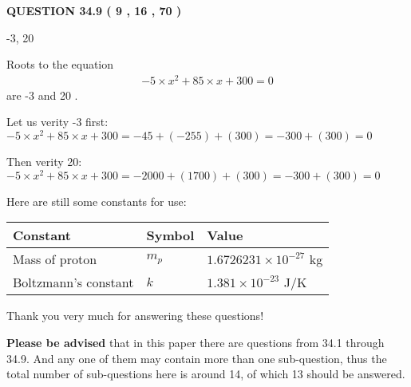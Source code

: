 \documentclass[12pt]{article}
\begin{document}
 
 
  
\vspace{0.2in}
  
{\textbf{\Large{QUESTION
34.9 
 (           9 ,          16 ,          70 )
}}}
  
  


 
 
\noindent{}

-3,  %
20
 
 
 
 
 
\noindent{}

Roots to the equation
\begin{eqnarray*}
-5 \times x^2  %
+  %
85
                 \times x    %
+  %
300 =0
\end{eqnarray*}
are  %
-3 and  %
20 .
 
Let us verity  %
-3 first:
$  %
-5 \times x^2  %
+  %
85
                 \times x    %
+  %
300
  = %
-45+( %
-255)+( %
300)
  = %
-300+( %
300)
  = %
0
$
 
Then verity  %
20:
$  %
-5 \times x^2  %
+  %
85
                 \times x    %
+  %
300
  = %
-2000+( %
1700)+( %
300)
  = %
-300+( %
300)
  = %
0
$
 
 
 
   
   
 \vspace{0.2in}
Here are still some constants for use:
 
 
\noindent\begin{tabular}{|l|l|l|}
\hline
Constant & Symbol & Value \\
\hline
 
Mass of proton &
$m_p$ &
 $ 1.6726231 \times 10^{-27} $
kg \\
\hline
 
Boltzmann's constant &
$k$ &
 $ 1.381 \times 10^{-23} $
J/K \\
\hline
 
\end{tabular}
 
Thank you very much for answering these questions!
 
{\textbf{\large{Please be advised}}} that in this paper there are questions from
34.1 through
34.9.
And any one of them may contain more than one sub-question, thus the total number
of sub-questions here is around 14, of which
13 should be answered.
 
\end{document}
